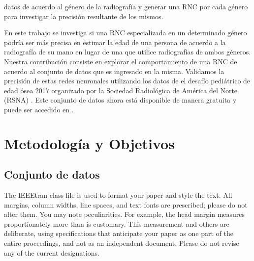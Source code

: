 \documentclass[conference]{IEEEtran}
\begin{document}
datos de acuerdo al género de la radiografía y generar una RNC por cada género para investigar la precisión resultante de los mismos. 

En este trabajo se investiga si una RNC especializada en un determinado género podría ser más precisa en estimar la edad de una persona de acuerdo a la radiografía de su mano en lugar de una que utilice radiografías de ambos géneros. Nuestra contribución consiste en explorar el comportamiento de una RNC de acuerdo al conjunto de datos que es ingresado en la misma. Validamos la precisión de estas redes neuronales utilizando los datos de el desafío pediátrico de edad ósea 2017 organizado por la Sociedad Radiológica de América del Norte (RSNA) \cite{RSNAChallenge}. Este conjunto de datos ahora está disponible de manera gratuita y puede ser accedido en \cite{RSNADataSet}.


\section{Metodología y Objetivos}

\subsection{Conjunto de datos}

The IEEEtran class file is used to format your paper and style the text. All margins, 
column widths, line spaces, and text fonts are prescribed; please do not 
alter them. You may note peculiarities. For example, the head margin
measures proportionately more than is customary. This measurement 
and others are deliberate, using specifications that anticipate your paper 
as one part of the entire proceedings, and not as an independent document. 
Please do not revise any of the current designations.

\end{document}
